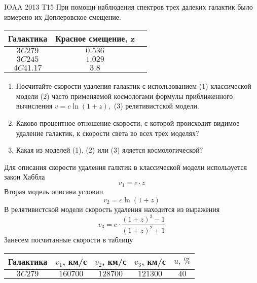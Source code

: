 \begin{problem}{IOAA 2013 T15}
	При помощи наблюдения спектров трех далеких галактик было измерено их Доплеровское смещение.\\
    \begin{table}[h]
    \centering
    \begin{tabular}{|c|c|c|}\hline
        Галактика & Красное смещение, z \\ \hline
        $3C279$ & $0.536$ \\ \hline
        $3C245$ & $1.029$ \\ \hline
        $4C41.17$ & $3.8$ \\ \hline
    \end{tabular}
    \end{table}
    \begin{enumerate}
        \item Посчитайте скорости удаления галактик с использованием (1) классической модели (2) часто применяемой космологами формулы приближенного вычисления $v=c\ln{(1+z)}$,~(3) релятивистской модели.
        \item Каково процентное отношение скорости, с которой происходит видимое удаление галактик, к скорости света во всех трех моделях?
        \item Какая из моделей (1), (2) или (3) яляется космологической?
    \end{enumerate} 
\begin{solution}
	Для описания скорости удаления галктик в классической модели используется закон Хаббла 
    \begin{equation}
        v_1=c\cdot z
    \end{equation}
    Вторая модель описана условии
    \begin{equation}
        v_2=c\ln{(1+z)}
    \end{equation}
    В релятивистской модели скорость удаления находится из выражения
    \begin{equation}
        v_3=c\cdot\frac{(1+z)^2-1}{(1+z)^2+1}
    \end{equation}
    Занесем посчитанные скорости в таблицу\\
    \begin{table}[h]
    \centering
    \begin{tabular}{|c|c|c|c|c|}\hline
        Галактика & $v_1$, км/с & $v_2$, км/с & $v_3$, км/с & $u,~\%$ \\ \hline
        $3C279$ & $160700$ & $128700$ & $121300$ & $40$ \\ \hline

\end{tabular}
\end{table}
\end{solution}
\end{problem}
